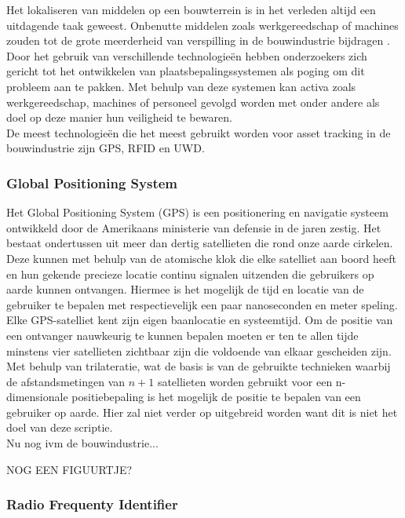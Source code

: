 Het lokaliseren van middelen op een bouwterrein is in het verleden altijd een uitdagende taak geweest. Onbenutte middelen zoals werkgereedschap of machines zouden tot de grote meerderheid van verspilling in de bouwindustrie bijdragen \autocite{Nasr2013}. Door het gebruik van verschillende technologieën hebben onderzoekers zich gericht tot het ontwikkelen van plaatsbepalingssystemen als poging om dit probleem aan te pakken. Met behulp van deze systemen kan activa zoals werkgereedschap, machines of personeel gevolgd worden met onder andere als doel op deze manier hun veiligheid te bewaren.\\

De meest technologieën die het meest gebruikt worden voor asset tracking in de bouwindustrie zijn GPS, RFID en UWD.

\subsubsection{Global Positioning System}

Het Global Positioning System (GPS) is een positionering en navigatie systeem ontwikkeld door de Amerikaans ministerie van defensie \autocite{McNeff} in de jaren zestig. Het bestaat ondertussen uit meer dan dertig satellieten die rond onze aarde cirkelen. Deze kunnen met behulp van de atomische klok die elke satelliet aan boord heeft en hun gekende precieze locatie continu signalen uitzenden die gebruikers op aarde kunnen ontvangen. Hiermee is het mogelijk de tijd en locatie van de gebruiker te bepalen met respectievelijk een paar nanoseconden en meter speling. Elke GPS-satelliet kent zijn eigen baanlocatie en systeemtijd. Om de positie van een ontvanger nauwkeurig te kunnen bepalen moeten er ten te allen tijde minstens vier satellieten zichtbaar zijn die voldoende van elkaar gescheiden zijn. Met behulp van trilateratie, wat de basis is van de gebruikte technieken waarbij de afstandsmetingen van \(n + 1\) satellieten worden gebruikt voor een n-dimensionale positiebepaling \autocite{Rahman2012} is het mogelijk de positie te bepalen van een gebruiker op aarde. Hier zal niet verder op uitgebreid worden want dit is niet het doel van deze scriptie.\\

Nu nog ivm de bouwindustrie...

NOG EEN FIGUURTJE?

\subsubsection{Radio Frequenty Identifier}

